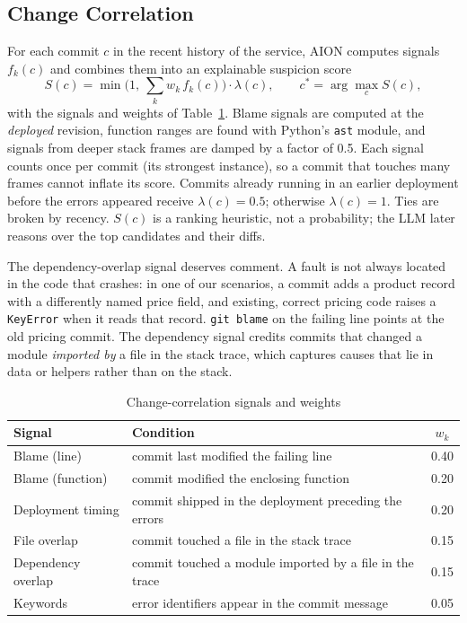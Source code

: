 \documentclass[conference]{IEEEtran}
\begin{document}
\subsection{Change Correlation}
\label{sec:corr}
For each commit $c$ in the recent history of the service, AION computes signals $f_k(c)$ and combines them into an explainable suspicion score
\begin{equation}
S(c) = \min\Big(1,\ \sum_k w_k\, f_k(c)\Big)\cdot \lambda(c),
\qquad c^\ast = \arg\max_c S(c),
\label{eq:score}
\end{equation}
with the signals and weights of Table~\ref{tab:weights}. Blame signals are computed at the \emph{deployed} revision, function ranges are found with Python's \texttt{ast} module, and signals from deeper stack frames are damped by a factor of 0.5. Each signal counts once per commit (its strongest instance), so a commit that touches many frames cannot inflate its score. Commits already running in an earlier deployment before the errors appeared receive $\lambda(c)=0.5$; otherwise $\lambda(c)=1$. Ties are broken by recency. $S(c)$ is a ranking heuristic, not a probability; the LLM later reasons over the top candidates and their diffs.

The dependency-overlap signal deserves comment. A fault is not always located in the code that crashes: in one of our scenarios, a commit adds a product record with a differently named price field, and existing, correct pricing code raises a \texttt{KeyError} when it reads that record. \texttt{git blame} on the failing line points at the old pricing commit. The dependency signal credits commits that changed a module \emph{imported by} a file in the stack trace, which captures causes that lie in data or helpers rather than on the stack.

\begin{table}[t]
\centering
\caption{Change-correlation signals and weights}
\label{tab:weights}
\footnotesize
\begin{tabular}{@{}p{2.3cm}p{4.6cm}c@{}}
\toprule
Signal & Condition & $w_k$ \\
\midrule
Blame (line) & commit last modified the failing line & 0.40 \\
Blame (function) & commit modified the enclosing function & 0.20 \\
Deployment timing & commit shipped in the deployment preceding the errors & 0.20 \\
File overlap & commit touched a file in the stack trace & 0.15 \\
Dependency overlap & commit touched a module imported by a file in the trace & 0.15 \\
Keywords & error identifiers appear in the commit message & 0.05 \\
\bottomrule
\end{tabular}
\end{table}
\end{document}
